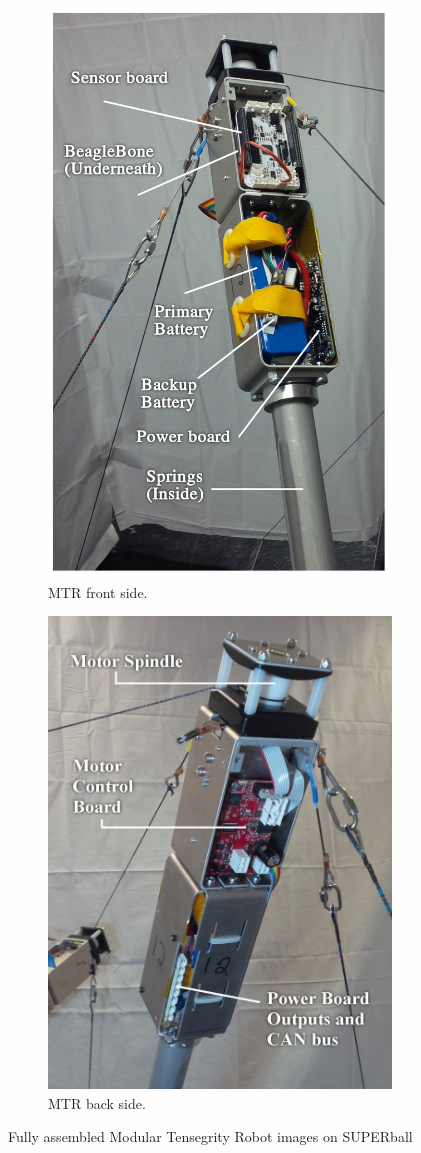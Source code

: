 \begin{figure}[thpb]
\begin{subfigure}{.5\textwidth}
      \centering
      \includegraphics[width=0.6\columnwidth]{tex/img/endcap_upclose_sensorboard_labelled_fixedfonts}
      \caption{MTR front side.}
      \label{fig:endcap_upclose_front}
\end{subfigure}
\begin{subfigure}{.5\textwidth}
      \centering
      \includegraphics[width=0.7\columnwidth]{tex/img/endcap_upclose_motorboard_labelled_fixedfonts}
      \caption{MTR back side.}
      \label{fig:endcap_upclose_back}
\end{subfigure}
\caption{Fully assembled Modular Tensegrity Robot images on SUPERball}
\label{fig:fully_assembled_endcap}
\end{figure}


